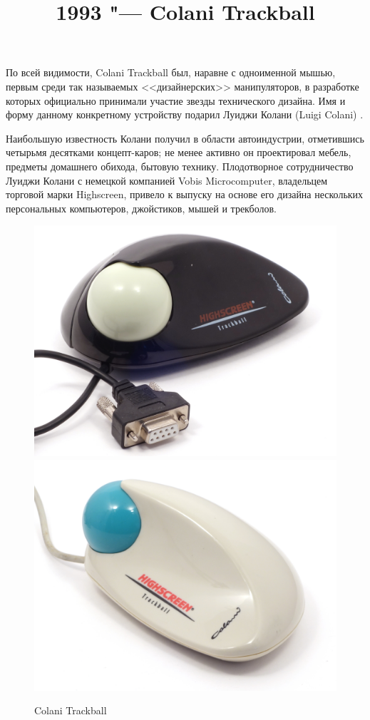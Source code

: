 \documentclass[11pt, a4paper]{article}
\begin{document}
\title{1993 "--- Colani Trackball}
\date{}
\maketitle
{}
По всей видимости, Colani Trackball был, наравне с одноименной мышью, первым среди так называемых <<дизайнерских>> манипуляторов, в разработке которых официально принимали участие звезды технического дизайна. Имя и форму данному конкретному устройству подарил Луиджи Колани (Luigi Colani) \cite{wiki}.

{Наибольшую известность Колани получил в области автоиндустрии, отметившись четырьмя десятками концепт-каров; не менее активно он проектировал мебель, предметы домашнего обихода, бытовую технику. Плодотворное сотрудничество Луиджи Колани с немецкой компанией Vobis Microcomputer, владельцем торговой марки Highscreen, привело к выпуску на основе его дизайна нескольких персональных компьютеров, джойстиков, мышей и трекболов.}

\begin{figure}[h]
    \centering
    \includegraphics[scale=0.46]{1993_colani_trackball/pic_b_60.jpg}
    \includegraphics[scale=0.46]{1993_colani_trackball/pic_w_60.jpg}
    \caption{Colani Trackball}
    \label{fig:ColaniPic}
\end{figure}
\end{document}
